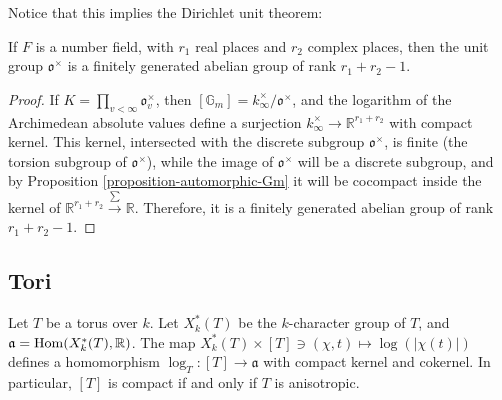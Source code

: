 Notice that this implies the Dirichlet unit theorem:

\begin{proposition}
 \label{proposition-Dirichlet-unit}
If $F$ is a number field, with $r_1$ real places and $r_2$ complex places, then the unit group $\mathfrak o^\times$ is a finitely generated abelian group of rank $r_1+r_2-1$.
\end{proposition}

\begin{proof}
 If $K = \prod_{v<\infty} \mathfrak o_v^\times$, then $[\mathbb G_m] = k^\times_\infty /\mathfrak o^\times$, and the logarithm of the Archimedean absolute values define a surjection $k^\times_\infty \to \mathbb R^{r_1+r_2}$ with compact kernel. This kernel, intersected with the discrete subgroup $\mathfrak o^\times$, is finite (the torsion subgroup of $\mathfrak o^\times$), while the image of $\mathfrak o^\times$ will be a discrete subgroup, and by Proposition \ref{proposition-automorphic-Gm} it will be cocompact inside the kernel of $\mathbb R^{r_1+r_2}\xrightarrow{\sum} \mathbb R$. Therefore, it is a finitely generated abelian group of rank $r_1+r_2-1$.
\end{proof}




\subsection{Tori}
\label{subsection-tori}

\begin{proposition}
\label{proposition-automorphic-tori}
 Let $T$ be a torus over $k$. Let $X^*_k(T)$ be the $k$-character group of $T$, and $\mathfrak a = \mathop{\rm Hom}\nolimits(X^*_k(T) , \mathbb R)$. The map $X^*_k(T) \times [T] \ni (\chi, t) \mapsto \log(|\chi(t)|)$ defines a homomorphism $\log_T:[T]\to\mathfrak a$ with compact kernel and cokernel. In particular, $[T]$ is compact if and only if $T$ is anisotropic.  
\end{proposition}

